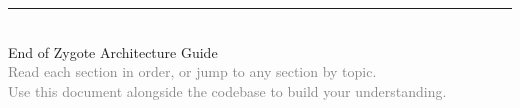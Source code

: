 \documentclass[12pt, a4paper]{article}
\begin{document}
\vfill

\begin{center}
\textcolor{gray}{\rule{6cm}{0.4pt}}\\[0.5cm]
{\large\textcolor{zygotePrimary}{End of Zygote Architecture Guide}}\\[0.3cm]
{\small\textcolor{gray}{Read each section in order, or jump to any section by topic.\\
Use this document alongside the codebase to build your understanding.}}
\end{center}
\end{document}

